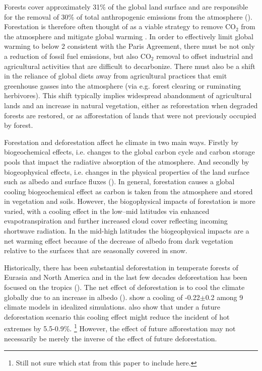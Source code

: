 \documentclass[]{article}
\begin{document}
Forests cover approximately 31\% of the global land surface \parencite{fao_global_2020} and are responsible for the removal of 30\% of total anthropogenic emissions from the atmosphere (\cite{friedlingstein_global_2022}).
Forestation is therefore often thought of as a viable strategy to remove CO$_2$ from the atmosphere and mitigate global warming \parencite{smith_long-term_2022}.
In order to effectively limit global warming to below 2 \textcelsius{} consistent with the Paris Agreement, there must be not only a reduction of fossil fuel emissions, but also CO$_2$ removal to offset industrial and agricultural activities that are difficult to decarbonize.
There must also be a shift in the reliance of global diets away from agricultural practices that emit greenhouse gasses into the atmosphere (via e.g. forest clearing or ruminating herbivores).
This shift typically implies widespread abandonment of agricultural lands and an increase in natural vegetation, either as reforestation when degraded forests are restored, or as afforestation of lands that were not previously occupied by forest.

Forestation and deforestation affect he climate in two main ways.
Firstly by biogeochemical effects, i.e. changes to the global carbon cycle and carbon storage pools that impact the radiative absorption of the atmosphere.
And secondly by biogeophysical effects, i.e. changes in the physical properties of the land surface such as albedo and surface fluxes (\cite{bala_combined_2007}).
In general, forestation causes a global cooling biogeochemical effect as carbon is taken from the atmosphere and stored in vegetation and soils.
However, the biogophysical impacts of forestation is more varied, with a cooling effect in the low–mid latitudes via enhanced evapotranspiration and further increased cloud cover reflecting incoming shortwave radiation.
In the mid-high latitudes the biogeophysical impacts are a net warming effect because of the decrease of albedo from dark vegetation relative to the surfaces that are seasonally covered in snow.

Historically, there has been substantial deforestation in temperate forests of Eurasia and North America and in the last few decades deforestation has been focused on the tropics (\cite{goldewijk_estimating_2001}).
The net effect of deforestation is to cool the climate globally due to an increase in albedo  (\cite{davin_climatic_2010}).
\cite{boysen_global_2020} show a cooling of -0.22$\pm$0.2 \textcelsius{} among 9 climate models in idealized simulations.
\cite{hong_impacts_2022} also show that under a future deforestation scenario this cooling effect might reduce the incident of hot extremes by 5.5-0.9\%. \footnote{Still not sure which stat from this paper to include here.}
However, the effect of future afforestation may not necessarily be merely the inverse of the effect of future deforestation.
\end{document}
